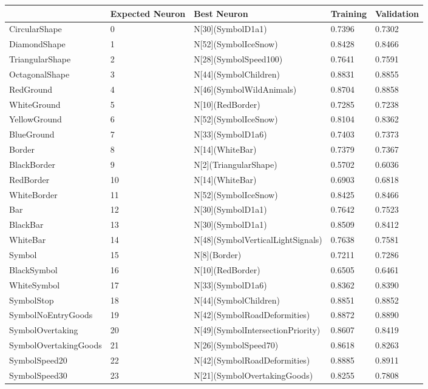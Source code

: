 \begin{tabular}{lllll}
\toprule
 & Expected Neuron & Best Neuron & Training & Validation \\
\midrule
CircularShape & 0 & N[30](SymbolD1a1) & 0.7396 & 0.7302 \\
DiamondShape & 1 & N[52](SymbolIceSnow) & 0.8428 & 0.8466 \\
TriangularShape & 2 & N[28](SymbolSpeed100) & 0.7641 & 0.7591 \\
OctagonalShape & 3 & N[44](SymbolChildren) & 0.8831 & 0.8855 \\
RedGround & 4 & N[46](SymbolWildAnimals) & 0.8704 & 0.8858 \\
WhiteGround & 5 & N[10](RedBorder) & 0.7285 & 0.7238 \\
YellowGround & 6 & N[52](SymbolIceSnow) & 0.8104 & 0.8362 \\
BlueGround & 7 & N[33](SymbolD1a6) & 0.7403 & 0.7373 \\
Border & 8 & N[14](WhiteBar) & 0.7379 & 0.7367 \\
BlackBorder & 9 & N[2](TriangularShape) & 0.5702 & 0.6036 \\
RedBorder & 10 & N[14](WhiteBar) & 0.6903 & 0.6818 \\
WhiteBorder & 11 & N[52](SymbolIceSnow) & 0.8425 & 0.8466 \\
Bar & 12 & N[30](SymbolD1a1) & 0.7642 & 0.7523 \\
BlackBar & 13 & N[30](SymbolD1a1) & 0.8509 & 0.8412 \\
WhiteBar & 14 & N[48](SymbolVerticalLightSignals) & 0.7638 & 0.7581 \\
Symbol & 15 & N[8](Border) & 0.7211 & 0.7286 \\
BlackSymbol & 16 & N[10](RedBorder) & 0.6505 & 0.6461 \\
WhiteSymbol & 17 & N[33](SymbolD1a6) & 0.8362 & 0.8390 \\
SymbolStop & 18 & N[44](SymbolChildren) & 0.8851 & 0.8852 \\
SymbolNoEntryGoods & 19 & N[42](SymbolRoadDeformities) & 0.8872 & 0.8890 \\
SymbolOvertaking & 20 & N[49](SymbolIntersectionPriority) & 0.8607 & 0.8419 \\
SymbolOvertakingGoods & 21 & N[26](SymbolSpeed70) & 0.8618 & 0.8263 \\
SymbolSpeed20 & 22 & N[42](SymbolRoadDeformities) & 0.8885 & 0.8911 \\
SymbolSpeed30 & 23 & N[21](SymbolOvertakingGoods) & 0.8255 & 0.7808 \\

\end{tabular}
